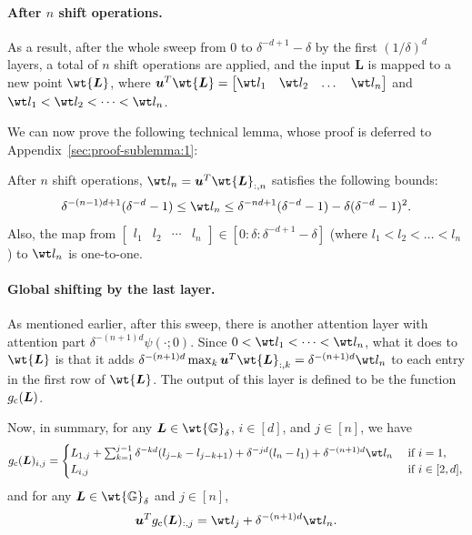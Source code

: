 \documentclass{article} %
\def\vu{{\bm{u}}}
\def\mL{{\bm{L}}}
\def\sG{{\mathbb{G}}}
\def\emL{{L}}
\begin{document}
\paragraph{After $n$ shift operations.}
As a result, after the whole sweep from $0$ to $\delta^{-d+1}-\delta$ by the first $(1/\delta)^d$ layers, a total of $n$ shift operations are applied, and the input $\mL$ is mapped to a new point $\wt \mL$, where $\vu^T \wt \mL = \begin{bmatrix}\wt l_1 & \wt l_2 & \dots & \wt l_n \end{bmatrix}$ and $\wt l_1 < \wt l_2 < \dots < \wt l_n$.

We can now prove the following technical lemma, whose proof is deferred to Appendix~\ref{sec:proof-sublemma:1}:
\begin{lemma}
\label{sublemma:1}
After $n$ shift operations, $\wt l_n = \vu^T \wt \mL_{:,n}$ satisfies the following bounds:
\begin{equation*}
    \delta^{-(n-1)d+1}(\delta^{-d} - 1) 
    \leq \wt l_n 
    \leq \delta^{-nd + 1}(\delta^{-d}-1) - \delta (\delta^{-d} - 1)^2.
\end{equation*}
Also, the map from $\begin{bmatrix} l_1 & l_2 & \cdots & l_n \end{bmatrix} \in [0:\delta:\delta^{-d+1}-\delta]$ (where $l_1 < l_2 < \dots < l_n$) to $\wt l_n$ is one-to-one.
\end{lemma}

\paragraph{Global shifting by the last layer.}
As mentioned earlier, after this sweep, there is another attention layer with attention part $\delta^{-(n+1)d} \psi(\cdot;0)$.
Since $0<\wt l_1 < \cdots < \wt l_n$, what it does to $\wt \mL$ is that it adds $\delta^{-(n+1)d} \max_k \vu^T \wt \mL_{:,k} = \delta^{-(n+1)d} \wt l_n$ to each entry in the first row of $\wt \mL$. The output of this layer is defined to be the function $g_{\rm c}(\mL)$.

Now, in summary, for any $\mL \in \wt {\sG}_{\delta}$, $i \in [d]$, and $j \in [n]$, we have
\begin{equation*}
    g_{\rm c}(\mL)_{i,j} = 
    \begin{cases}
        \emL_{1,j} + \sum_{k=1}^{j-1} \delta^{-kd}(l_{j-k}-l_{j-k+1}) + \delta^{-jd} (l_n-l_1) + \delta^{-(n+1)d} \wt l_n & \text { if } i = 1,\\
        \emL_{i,j} & \text { if } i \in [2,d],
    \end{cases}
\end{equation*}
and for any $\mL \in \wt {\sG}_{\delta}$ and $j \in [n]$,
\begin{equation*}
    \vu^T g_{\rm c}(\mL)_{:,j} = \wt l_{j} + \delta^{-(n+1)d} \wt l_n.
\end{equation*}
\end{document}
